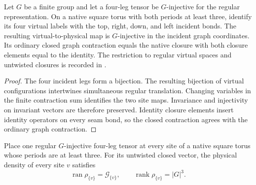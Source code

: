 \begin{lemma}%
    \label{lem:peps_native_regular_incident_injectivity}
    \leanok
    Let $G$ be a finite group and let a four-leg tensor be $G$-injective
    for the regular representation. On a native square torus with
    both periods at least three, identify its four virtual labels with
    the top, right, down, and left incident bonds. The resulting
    virtual-to-physical map is $G$-injective in the incident
    graph coordinates. Its ordinary closed graph contraction equals
    the native closure with both closure elements equal to the identity.
    The restriction to regular virtual spaces and untwisted closures is recorded in
    \cite{gap:rmp_peps_quantum_double_g_isometry}.
\end{lemma}

\begin{proof}\leanok
    The four incident legs form a bijection. The resulting bijection of
    virtual configurations intertwines simultaneous regular
    translation. Changing variables in the finite contraction sum
    identifies the two site maps. Invariance and injectivity on
    invariant vectors are therefore preserved. Identity closure
    elements insert identity operators on every seam bond, so the
    closed contraction agrees with the ordinary graph contraction.
\end{proof}

\begin{lemma}%
    \label{thm:peps_native_regular_singleton_support}
    \leanok
    Place one regular $G$-injective four-leg tensor at every site of a
    native square torus whose periods are at least three. For its
    untwisted closed vector, the physical density of every site $v$
    satisfies
    \[
        \operatorname{ran}\rho_{\{v\}}=\mathcal G_{\{v\}},
        \qquad \operatorname{rank}\rho_{\{v\}}=|G|^3.
    \]
\end{lemma}

